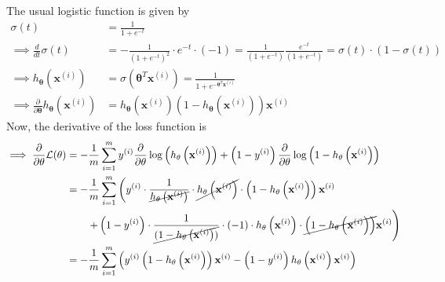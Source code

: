 The usual logistic function is given by
\begin{align*}
    \sigma\left(t\right)
     & =
    \frac{1}{1+e^{-t}}
    \\
    \implies
    \frac{d}{dt} \sigma\left(t\right)
     & =
    -\frac{1}{{\left(1+e^{-t}\right)}^2} \cdot e^{-t} \cdot (-1)
    =
    \frac{1}{\left(1+e^{-t}\right)}
    \frac{e^{-t}}{\left(1+e^{-t}\right)}
    =
    \sigma\left(t\right) \cdot \left(1-\sigma\left(t\right)\right)
    \\
    \implies
    h_{\mathbf{\theta}}\left(\mathbf{x}^{(i)}\right)
     & =
    \sigma\left(\mathbf{\theta}^{T} \mathbf{x}^{(i)}\right)
    =
    \frac{1}{1+e^{-\mathbf{\theta}^{T} \mathbf{x}^{(i)}}}
    \\
    \implies
    \frac{\partial}{\partial \mathbf{\theta}} h_{\mathbf{\theta}}\left(\mathbf{x}^{(i)}\right)
     & =
    h_{\mathbf{\theta}}\left(\mathbf{x}^{(i)}\right) \left(1-h_{\mathbf{\theta}}\left(\mathbf{x}^{(i)}\right)\right) \mathbf{x}^{(i)}
\end{align*}
Now, the derivative of the loss function is
\begin{align*}
    \implies
    \frac{\partial}{\partial \mathbf{\theta}} \mathcal{L}(\mathbf{\theta})
     & =
    -\frac{1}{m} \sum_{i=1}^{m}
    y^{(i)} \frac{\partial}{\partial \mathbf{\theta}} \log \left(h_{\mathbf{\theta}}\left(\mathbf{x}^{(i)}\right)\right)
    +
    \left(1-y^{(i)}\right) \frac{\partial}{\partial \mathbf{\theta}} \log \left(1-h_{\mathbf{\theta}}\left(\mathbf{x}^{(i)}\right)\right)
    \\ & =
    -\frac{1}{m} \sum_{i=1}^{m}
    \left(
    y^{(i)}
    \cdot \frac{1}{\cancel{h_{\mathbf{\theta}}\left(\mathbf{x}^{(i)}\right)}}
    \cdot \cancel{h_{\mathbf{\theta}}\left(\mathbf{x}^{(i)}\right)}
    \cdot \left(1-h_{\mathbf{\theta}}\left(\mathbf{x}^{(i)}\right)\right)
    \mathbf{x}^{(i)}
    \right.
    \\ & \qquad
    \left.
    +
    \left(1-y^{(i)}\right)
    \cdot \frac{1}{\cancel{(1-h_{\mathbf{\theta}}\left(\mathbf{x}^{(i)}\right))}}
    \cdot (-1)
    \cdot h_{\mathbf{\theta}}\left(\mathbf{x}^{(i)}\right)
    \cdot \cancel{\left(1-h_{\mathbf{\theta}}\left(\mathbf{x}^{(i)}\right)\right)}
    \mathbf{x}^{(i)}
    \right)
    \\ & =
    -\frac{1}{m} \sum_{i=1}^{m}
    \left(
    y^{(i)} \left(1-h_{\mathbf{\theta}}\left(\mathbf{x}^{(i)}\right)\right) \mathbf{x}^{(i)}
    -
    \left(1-y^{(i)}\right) h_{\mathbf{\theta}}\left(\mathbf{x}^{(i)}\right) \mathbf{x}^{(i)}
    \right)
\end{align*}
